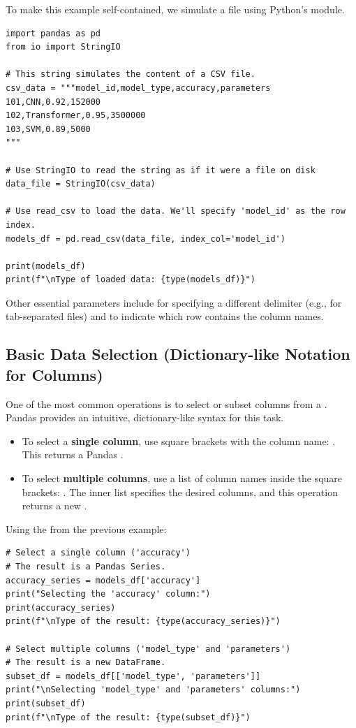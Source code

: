 \begin{example}
To make this example self-contained, we simulate a file using Python's  module.
\text{ }\begin{verbatim}
import pandas as pd
from io import StringIO

# This string simulates the content of a CSV file.
csv_data = """model_id,model_type,accuracy,parameters
101,CNN,0.92,152000
102,Transformer,0.95,3500000
103,SVM,0.89,5000
"""

# Use StringIO to read the string as if it were a file on disk
data_file = StringIO(csv_data)

# Use read_csv to load the data. We'll specify 'model_id' as the row index.
models_df = pd.read_csv(data_file, index_col='model_id')

print(models_df)
print(f"\nType of loaded data: {type(models_df)}")
\end{verbatim}
Other essential parameters include  for specifying a different delimiter (e.g.,  for tab-separated files) and  to indicate which row contains the column names.
\end{example}

\subsection{Basic Data Selection (Dictionary-like Notation for Columns)}
\label{subsec:pandas_selection}
One of the most common operations is to select or subset columns from a . Pandas provides an intuitive, dictionary-like syntax for this task.

\begin{itemize}
    \item To select a \textbf{single column}, use square brackets with the column name: . This returns a Pandas .
    \item To select \textbf{multiple columns}, use a list of column names inside the square brackets: . The inner list specifies the desired columns, and this operation returns a new .
\end{itemize}

\begin{example}
Using the  from the previous example:
\text{ }\begin{verbatim}
# Select a single column ('accuracy')
# The result is a Pandas Series.
accuracy_series = models_df['accuracy']
print("Selecting the 'accuracy' column:")
print(accuracy_series)
print(f"\nType of the result: {type(accuracy_series)}")

# Select multiple columns ('model_type' and 'parameters')
# The result is a new DataFrame.
subset_df = models_df[['model_type', 'parameters']]
print("\nSelecting 'model_type' and 'parameters' columns:")
print(subset_df)
print(f"\nType of the result: {type(subset_df)}")
\end{verbatim}
\end{example}


